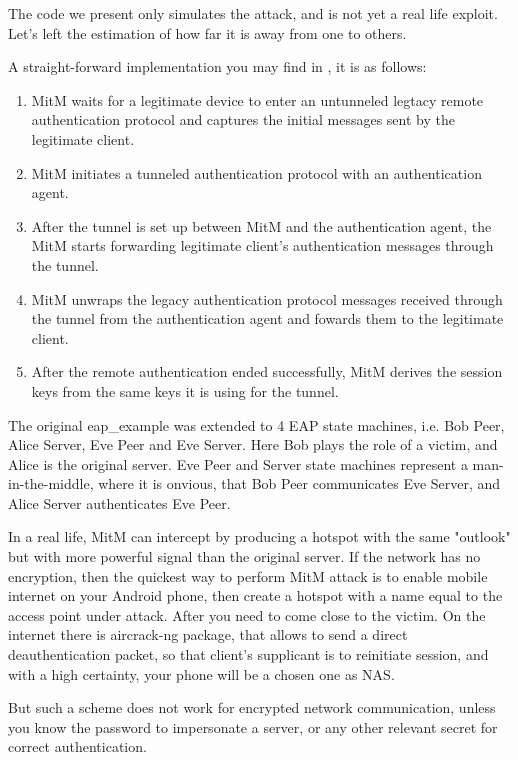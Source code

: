 \documentclass{extarticle}
\begin{document}
The code \cite{GMI} we present only simulates the attack,
and is not yet a real life exploit.
Let's left the estimation of how far it is away from one
to others.

A straight-forward implementation you may find in \cite{tap2002},
it is as follows:
\begin{enumerate}
  \item MitM waits for a legitimate device to enter an untunneled legtacy remote
    authentication protocol
    and captures the initial messages sent by the legitimate client.
  \item MitM initiates a tunneled authentication protocol with an authentication
    agent.
  \item After the tunnel is set up between MitM and the authentication agent,
    the MitM starts forwarding legitimate client's authentication messages
    through the tunnel.
  \item MitM unwraps the legacy authentication protocol messages received through
    the tunnel from the authentication agent
    and fowards them to the legitimate client.
  \item After the remote authentication ended successfully,
    MitM derives the session keys from the same keys it is using for the tunnel.
\end{enumerate}

The original eap\_example was extended to 4 EAP state machines,
i.e. Bob Peer, Alice Server, Eve Peer and Eve Server.
Here Bob plays the role of a victim,
and Alice is the original server.
Eve Peer and Server state machines represent
a man-in-the-middle,
where it is onvious,
that Bob Peer communicates Eve Server,
and Alice Server authenticates Eve Peer.

In a real life, MitM can intercept by producing a hotspot with the same
"outlook" but with more powerful signal than the original server.
If the network has no encryption,
then the quickest way to perform MitM attack is to enable mobile
internet on your Android phone,
then create a hotspot with a name equal to the access point under attack.
After you need to come close to the victim.
On the internet there is aircrack-ng package,
that allows to send a direct deauthentication packet,
so that client's supplicant is to reinitiate session,
and with a high certainty, your phone will be a chosen one as NAS.

But such a scheme does not work for encrypted network communication,
unless you know the password to impersonate a server,
or any other relevant secret for correct authentication.
\end{document}
